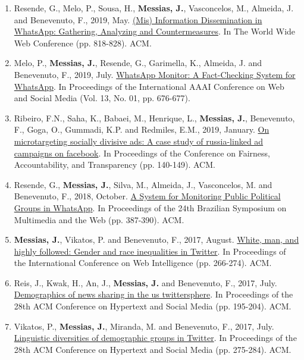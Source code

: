 \begin{enumerate}

    \item Resende, G., Melo, P., Sousa, H., \textbf{Messias, J.}, Vasconcelos, M., Almeida, J. and Benevenuto, F., 2019, May. \href{https://people.mpi-sws.org/~johnme/pdf/resende_www2019_whatsapp.pdf}{(Mis) Information Dissemination in WhatsApp: Gathering, Analyzing and Countermeasures}. In The World Wide Web Conference (pp. 818-828). ACM.
    \item Melo, P., \textbf{Messias, J.}, Resende, G., Garimella, K., Almeida, J. and Benevenuto, F., 2019, July. \href{https://people.mpi-sws.org/~johnme/pdf/melo-icwsm-2019-demo.pdf}{WhatsApp Monitor: A Fact-Checking System for WhatsApp}. In Proceedings of the International AAAI Conference on Web and Social Media (Vol. 13, No. 01, pp. 676-677).
    \item Ribeiro, F.N., Saha, K., Babaei, M., Henrique, L., \textbf{Messias, J.}, Benevenuto, F., Goga, O., Gummadi, K.P. and Redmiles, E.M., 2019, January. \href{https://people.mpi-sws.org/~johnme/pdf/ribeiro_fat19_ira_ads.pdf}{On microtargeting socially divisive ads: A case study of russia-linked ad campaigns on facebook}. In Proceedings of the Conference on Fairness, Accountability, and Transparency (pp. 140-149). ACM.
    \item Resende, G., \textbf{Messias, J.}, Silva, M., Almeida, J., Vasconcelos, M. and Benevenuto, F., 2018, October. \href{https://people.mpi-sws.org/~johnme/pdf/resende_webmedia2018_whatsapp.pdf}{A System for Monitoring Public Political Groups in WhatsApp}. In Proceedings of the 24th Brazilian Symposium on Multimedia and the Web (pp. 387-390). ACM.
    \item \textbf{Messias, J.}, Vikatos, P. and Benevenuto, F., 2017, August. \href{https://people.mpi-sws.org/~johnme/pdf/messias_wi17_inequality.pdf}{White, man, and highly followed: Gender and race inequalities in Twitter}. In Proceedings of the International Conference on Web Intelligence (pp. 266-274). ACM.
    \item Reis, J., Kwak, H., An, J., \textbf{Messias, J.} and Benevenuto, F., 2017, July. \href{https://people.mpi-sws.org/~johnme/pdf/reis_ht17_news-sharing.pdf}{Demographics of news sharing in the us twittersphere}. In Proceedings of the 28th ACM Conference on Hypertext and Social Media (pp. 195-204). ACM.
    \item Vikatos, P., \textbf{Messias, J.}, Miranda, M. and Benevenuto, F., 2017, July. \href{https://people.mpi-sws.org/~johnme/pdf/vikatos_ht17_linguistic-diversity.pdf}{Linguistic diversities of demographic groups in Twitter}. In Proceedings of the 28th ACM Conference on Hypertext and Social Media (pp. 275-284). ACM.

\end{enumerate}
